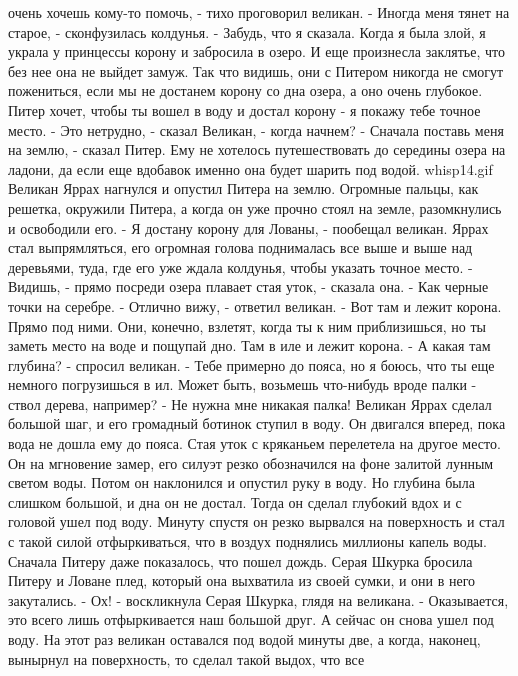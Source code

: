 очень хочешь кому-то помочь, - тихо проговорил великан.
    - Иногда меня тянет на старое, - сконфузилась колдунья. - Забудь, 
что я сказала. Когда я была злой, я украла у принцессы корону и 
забросила в озеро. И еще произнесла заклятье, что без нее она не 
выйдет замуж. Так что видишь, они с Питером никогда не смогут 
пожениться, если мы не достанем корону со дна озера, а оно очень 
глубокое. Питер хочет, чтобы ты вошел в воду и достал корону - я 
покажу тебе точное место.
    - Это нетрудно, - сказал Великан, - когда начнем?
    - Сначала поставь меня на землю, - сказал Питер. Ему не хотелось 
путешествовать до середины озера на ладони, да если еще вдобавок 
именно она будет шарить под водой.
    {whisp14.gif}
    Великан Яррах нагнулся и опустил Питера на землю. Огромные пальцы, 
как решетка, окружили Питера, а когда он уже прочно стоял на земле, 
разомкнулись и освободили его.
    - Я достану корону для Лованы, - пообещал великан.
    Яррах стал выпрямляться, его огромная голова поднималась все выше 
и выше над деревьями, туда, где его уже ждала колдунья, чтобы указать 
точное место.
    - Видишь, - прямо посреди озера плавает стая уток, - сказала она. 
- Как черные точки на серебре.
    - Отлично вижу, - ответил великан.
    - Вот там и лежит корона. Прямо под ними. Они, конечно, взлетят, 
когда ты к ним приблизишься, но ты заметь место на воде и пощупай дно. 
Там в иле и лежит корона.
    - А какая там глубина? - спросил великан.
    - Тебе примерно до пояса, но я боюсь, что ты еще немного 
погрузишься в ил. Может быть, возьмешь что-нибудь вроде палки - ствол 
дерева, например?
    - Не нужна мне никакая палка!
    Великан Яррах сделал большой шаг, и его громадный ботинок ступил в 
воду. Он двигался вперед, пока вода не дошла ему до пояса. Стая уток с 
кряканьем перелетела на другое место.
    Он на мгновение замер, его силуэт резко обозначился на фоне 
залитой лунным светом воды. Потом он наклонился и опустил руку в воду. 
Но глубина была слишком большой, и дна он не достал. Тогда он сделал 
глубокий вдох и с головой ушел под воду. Минуту спустя он резко 
вырвался на поверхность и стал с такой силой отфыркиваться, что в 
воздух поднялись миллионы капель воды.
    Сначала Питеру даже показалось, что пошел дождь. Серая Шкурка 
бросила Питеру и Ловане плед, который она выхватила из своей сумки, и 
они в него закутались.
    - Ох! - воскликнула Серая Шкурка, глядя на великана. - 
Оказывается, это всего лишь отфыркивается наш большой друг. А сейчас 
он снова ушел под воду.
    На этот раз великан оставался под водой минуты две, а когда, 
наконец, вынырнул на поверхность, то сделал такой выдох, что все 
